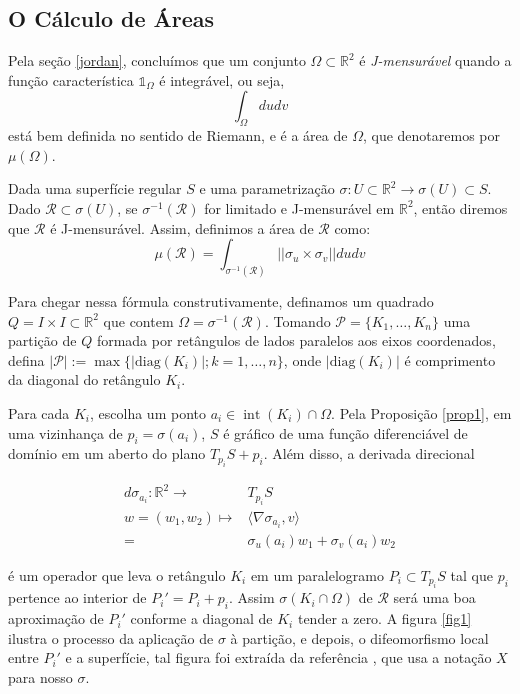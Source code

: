 \documentclass[12pt,letterpaper]{article}
\newcommand\rcur{\mathcal{R}}
\newcommand{\one}{\mathds{1}}
\newcommand{\rr}{\mathbb{R}^2}
\newcommand{\op}[1]{\operatorname{#1}}
\begin{document}
	\subsection{O Cálculo de Áreas}
		Pela seção \ref{jordan}, concluímos que um conjunto $\Omega\subset\rr$ é \textit{J-mensurável} quando a função característica $\one_\Omega$ é integrável, ou seja,
		$$\displaystyle\int_\Omega dudv$$
		está bem definida no sentido de Riemann, e é a área de $\Omega$, que denotaremos por $\mu(\Omega)$.
		
		Dada uma superfície regular $S$ e uma parametrização $\sigma:U\subset\rr\to \sigma(U)\subset S$. Dado $\rcur\subset \sigma(U)$, se $\sigma^{-1}(\rcur)$ for limitado e J-mensurável em $\rr$, então diremos que $\rcur$ é J-mensurável. Assim, definimos a área de $\rcur$ como:
		$$\mu(\rcur)=\displaystyle\int_{\sigma^{-1}(\rcur)}||\sigma_u\times\sigma_v||dudv$$
		
		Para chegar nessa fórmula construtivamente, definamos um quadrado $Q=I\times I\subset\rr$ que contem $\Omega=\sigma^{-1}(\rcur)$. Tomando $\mathscr{P}=\{K_1,\ldots,K_n\}$ uma partição de $Q$ formada por retângulos de lados paralelos aos eixos coordenados, defina $|\mathcal{P}|:=\max\{|\text{diag}(K_i)|;k=1,\ldots,n\}$, onde $|\text{diag}(K_i)|$ é comprimento da diagonal do retângulo $K_i$.
	
		Para cada $K_i$, escolha um ponto $a_i\in\op{int}(K_i)\cap \Omega$. Pela Proposição \ref{prop1}, em uma vizinhança de $p_i=\sigma(a_i)$, $S$ é gráfico de uma função diferenciável de domínio em um aberto do plano $T_{p_i}S+p_i$. Além disso, a derivada direcional
		
		\begin{align*}
			d\sigma_{a_i}:\rr\to& T_{p_i}S\\
				w=(w_1,w_2)\mapsto& \langle\nabla\sigma_{a_i},v\rangle\\
				=&\sigma_u(a_i)w_1 + \sigma_v(a_i)w_2
		\end{align*} 
		
		é um operador que leva o retângulo $K_i$ em um paralelogramo $P_i\subset T_{p_i}S$ tal que $p_i$ pertence ao interior de $P_i'=P_i+p_i$. Assim $\sigma(K_i\cap\Omega)$ de $\rcur$ será uma boa aproximação de $P_i'$ conforme a diagonal de $K_i$ tender a zero. A figura \ref{fig1} ilustra o processo da aplicação de $\sigma$ à partição, e depois, o difeomorfismo local entre $P_i'$ e a superfície, tal figura foi extraída da referência \cite{ronaldo}, que usa a notação $X$ para nosso $\sigma$. 
		
\end{document}
